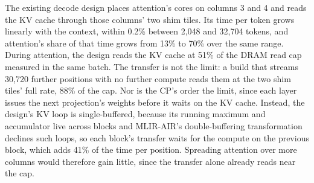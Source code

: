 The existing decode design places attention's cores on columns 3 and 4 and reads the KV cache through those columns' two shim tiles.
Its time per token grows linearly with the context, within 0.2\% between 2{,}048 and 32{,}704 tokens, and attention's share of that time grows from 13\% to 70\% over the same range.
During attention, the design reads the KV cache at 51\% of the DRAM read cap measured in the same batch.
The transfer is not the limit: a build that streams 30{,}720 further positions with no further compute reads them at the two shim tiles' full rate, 88\% of the cap.
Nor is the CP's order the limit, since each layer issues the next projection's weights before it waits on the KV cache.
Instead, the design's KV loop is single-buffered, because its running maximum and accumulator live across blocks and MLIR-AIR's double-buffering transformation declines such loops, so each block's transfer waits for the compute on the previous block, which adds 41\% of the time per position.
Spreading attention over more columns would therefore gain little, since the transfer alone already reads near the cap.

